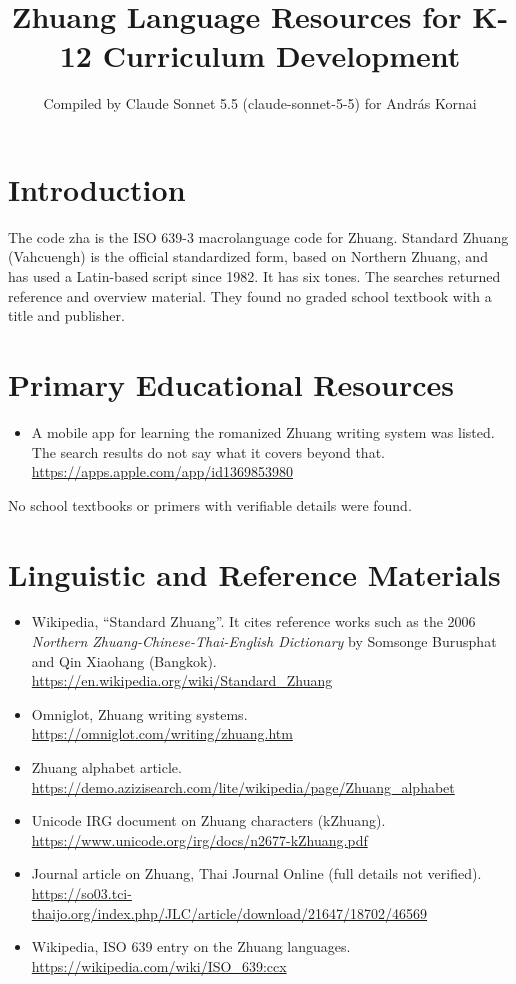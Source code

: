 \documentclass[12pt]{article}
\title{Zhuang Language Resources for K-12 Curriculum Development}
\author{Compiled by Claude Sonnet 5.5 (claude-sonnet-5-5) for Andr\'as Kornai}
\date{}
\begin{document}
\maketitle

\section{Introduction}
The code zha is the ISO 639-3 macrolanguage code for Zhuang. Standard Zhuang (Vahcuengh) is the official standardized form, based on Northern Zhuang, and has used a Latin-based script since 1982. It has six tones. The searches returned reference and overview material. They found no graded school textbook with a title and publisher.

\section{Primary Educational Resources}
\begin{itemize}
\item A mobile app for learning the romanized Zhuang writing system was listed. The search results do not say what it covers beyond that. \url{https://apps.apple.com/app/id1369853980}
\end{itemize}
No school textbooks or primers with verifiable details were found.

\section{Linguistic and Reference Materials}
\begin{itemize}
\item Wikipedia, ``Standard Zhuang''. It cites reference works such as the 2006 \textit{Northern Zhuang-Chinese-Thai-English Dictionary} by Somsonge Burusphat and Qin Xiaohang (Bangkok). \url{https://en.wikipedia.org/wiki/Standard_Zhuang}
\item Omniglot, Zhuang writing systems. \url{https://omniglot.com/writing/zhuang.htm}
\item Zhuang alphabet article. \url{https://demo.azizisearch.com/lite/wikipedia/page/Zhuang_alphabet}
\item Unicode IRG document on Zhuang characters (kZhuang). \url{https://www.unicode.org/irg/docs/n2677-kZhuang.pdf}
\item Journal article on Zhuang, Thai Journal Online (full details not verified). \url{https://so03.tci-thaijo.org/index.php/JLC/article/download/21647/18702/46569}
\item Wikipedia, ISO 639 entry on the Zhuang languages. \url{https://wikipedia.com/wiki/ISO_639:ccx}
\end{itemize}
\end{document}
